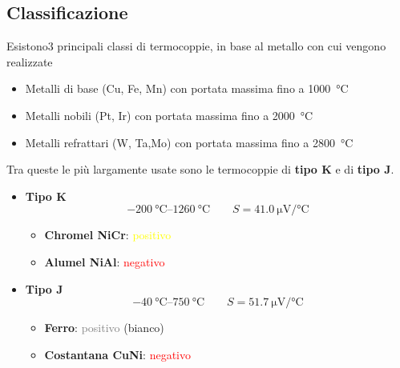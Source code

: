 \documentclass[a4paper, 15pt]{article}
\begin{document}
\newpage
\subsection{Classificazione}
\begin{adjustwidth}{2in}{}
	Esistono3 principali classi di termocoppie, in base al metallo con cui vengono realizzate
	\begin{itemize}
		\item Metalli di base (Cu, Fe, Mn) con portata massima fino a \SI{1000}{\celsius}
		\item Metalli nobili (Pt, Ir) con portata massima fino a \SI{2000}{\celsius}
		\item Metalli refrattari (W, Ta,Mo) con portata massima fino a \SI{2800}{\celsius}
	\end{itemize}
	Tra queste le più largamente usate sono le termocoppie di \textbf{tipo K} e di \textbf{tipo J}. \newline 
	
	\begin{itemize}
		\item \textbf{Tipo K}
		\[\SIrange{-200}{1260}{\celsius} \qquad S = \SI{41.0}{\micro\volt\per\celsius}\]
		\begin{itemize}
			\item \textbf{Chromel NiCr}: \textcolor{yellow}{positivo}
			\item \textbf{Alumel NiAl}: \textcolor{red}{negativo}
		\end{itemize}
		
		\item \textbf{Tipo J}
		\[\SIrange{-40}{750}{\celsius} \qquad S = \SI{51.7}{\micro\volt\per\celsius}\]
		\begin{itemize}
			\item \textbf{Ferro}: \textcolor{gray}{positivo} (bianco)
			\item \textbf{Costantana CuNi}: \textcolor{red}{negativo}
		\end{itemize}
	\end{itemize}
	

\end{adjustwidth}
\end{document}
